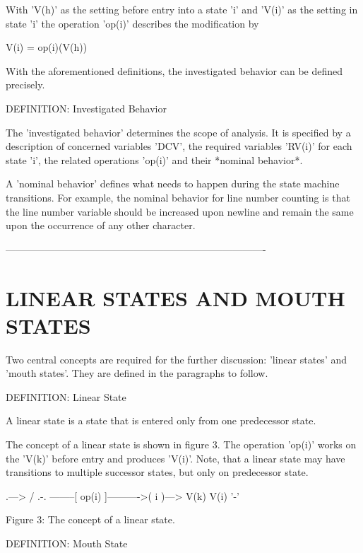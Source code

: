 \documentclass[12pt]{article}
\begin{document}
With 'V(h)' as the setting before entry into a state 'i' and 'V(i)' as the
setting in state 'i' the operation 'op(i)' describes the modification by 

                         V(i) = op(i)(V(h))

With the aforementioned definitions, the investigated behavior can be defined
precisely.

DEFINITION: Investigated Behavior 

   The 'investigated behavior' determines the scope of analysis. It is
   specified by a description of concerned variables 'DCV', the required
   variables 'RV(i)' for each state 'i', the related operations 'op(i)' and
   their *nominal behavior*.
    
A 'nominal behavior' defines what needs to happen during the state machine
transitions.  For example, the nominal behavior for line number counting is
that the line number variable should be increased upon newline and remain the
same upon the occurrence of any other character. 

-------------------------------------------------------------------------------

\section{LINEAR STATES AND MOUTH STATES}

Two central concepts are required for the further discussion: 'linear states' and 'mouth
states'.  They are defined in the paragraphs to follow. 

DEFINITION: Linear State

    A linear state is a state that is entered only from one predecessor state.

The concept of a linear state is shown in figure 3. The operation 'op(i)' works
on the 'V(k)' before entry and produces 'V(i)'. Note, that a linear state
may have transitions to multiple successor states, but only on predecessor state.


                                                      .---> 
                                                     /
                                                   .-.
                      --------[ op(i) ]---------->( i )---> 
                         V(k)              V(i)    '-'

                    Figure 3: The concept of a linear state.


DEFINITION: Mouth State
\end{document}
